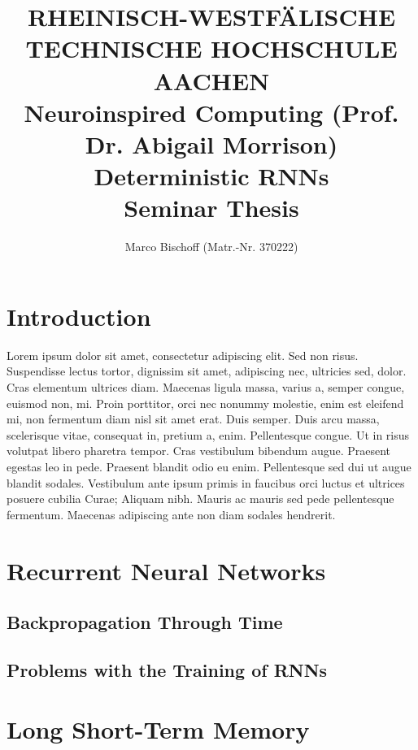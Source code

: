 \documentclass{article}
\title{
{\bf \scriptsize RHEINISCH-WESTF\"ALISCHE TECHNISCHE HOCHSCHULE AACHEN \\
Neuroinspired Computing (Prof. Dr. Abigail Morrison)} \vspace{2cm} \\
Deterministic RNNs \\
{\large Seminar Thesis} }
\author{
Marco Bischoff (Matr.-Nr. 370222)
}
\begin{document}


\pagestyle{headings}

\maketitle
\newpage

\tableofcontents
\newpage



\section{Introduction}
\label{ch:1}

Lorem ipsum dolor sit amet, consectetur adipiscing elit. Sed non risus. Suspendisse lectus
tortor, dignissim sit amet, adipiscing nec, ultricies sed, dolor. Cras elementum ultrices
diam. Maecenas ligula massa, varius a, semper congue, euismod non, mi. Proin porttitor,
orci nec nonummy molestie, enim est eleifend mi, non fermentum diam nisl sit amet erat.
Duis semper. Duis arcu massa, scelerisque vitae, consequat in, pretium a, enim.
Pellentesque congue. Ut in risus volutpat libero pharetra tempor. Cras vestibulum bibendum
augue. Praesent egestas leo in pede. Praesent blandit odio eu enim. Pellentesque sed dui
ut augue blandit sodales. Vestibulum ante ipsum primis in faucibus orci luctus et ultrices
posuere cubilia Curae; Aliquam nibh. Mauris ac mauris sed pede pellentesque fermentum.
Maecenas adipiscing ante non diam sodales hendrerit.



\section{Recurrent Neural Networks}
\label{ch:2}

\subsection{Backpropagation Through Time}
\label{sec:2.0}

\subsection{Problems with the Training of RNNs}
\label{sec:2.1}



\section{Long Short-Term Memory}
\label{ch:3}
\end{document}
